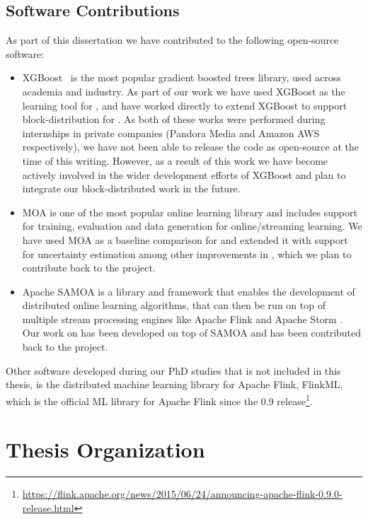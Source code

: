 \subsection{Software Contributions}
\label{sec:intro-software-contributions}

As part of this dissertation we have contributed to the following open-source software:

\begin{itemize}
	\item XGBoost~\cite{xgboost} is the most popular gradient boosted trees library,
	used across academia and industry. As part of our work we have used XGBoost as the
	learning tool for \sessionlength, and have worked directly to extend XGBoost to
	support block-distribution
	for \blockgbt. As both of these works were performed during internships in private
	companies (Pandora Media and Amazon AWS respectively), we have not been able to release
	the code as open-source at the time of this writing.
	However, as a result of this work we have become actively involved in the wider
	development efforts of XGBoost and plan to integrate our block-distributed
	work in the future.
	\item MOA \cite{moa-book} is one of the most popular online learning library and includes
	support for training, evaluation and data generation for online/streaming learning.
	We have used MOA as a baseline comparison for \boostvht and extended it with
	support for uncertainty estimation among other improvements in \uncertaintrees,
	which we plan to contribute back to the project.
	\item Apache SAMOA \cite{samoa} is a library and framework that enables the development
	of distributed online learning algorithms, that can then be run on top of multiple
	stream processing engines like Apache Flink \cite{flink} and Apache Storm \cite{storm}.
	Our work on \boostvht has been developed on top of SAMOA and has been contributed back
	to the project.
\end{itemize}

Other software developed during our PhD studies that is not included in this
thesis, is the distributed machine learning library for
Apache Flink, FlinkML, which is the official ML library for Apache Flink
since the 0.9 release\footnote{\url{https://flink.apache.org/news/2015/06/24/announcing-apache-flink-0.9.0-release.html}}.

\section{Thesis Organization}

